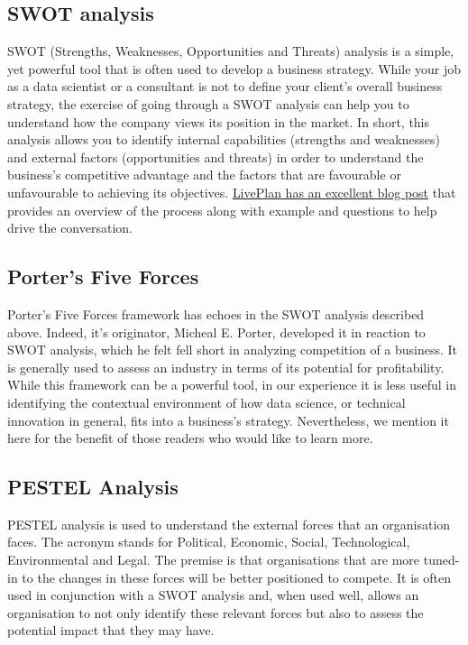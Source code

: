 \documentclass[
]{book}
\begin{document}
\hypertarget{swot-analysis}{%
\subsection{SWOT analysis}\label{swot-analysis}}

SWOT (Strengths, Weaknesses, Opportunities and Threats) analysis is a simple, yet powerful tool that is often used to develop a business strategy. While your job as a data scientist or a consultant is not to define your client's overall business strategy, the exercise of going through a SWOT analysis can help you to understand how the company views its position in the market. In short, this analysis allows you to identify internal capabilities (strengths and weaknesses) and external factors (opportunities and threats) in order to understand the business's competitive advantage and the factors that are favourable or unfavourable to achieving its objectives. \href{https://www.liveplan.com/blog/what-is-a-swot-analysis-and-how-to-do-it-right-with-examples/}{LivePlan has an excellent blog post} that provides an overview of the process along with example and questions to help drive the conversation.

\hypertarget{porters-five-forces}{%
\subsection{Porter's Five Forces}\label{porters-five-forces}}

Porter's Five Forces framework has echoes in the SWOT analysis described above. Indeed, it's originator, Micheal E. Porter, developed it in reaction to SWOT analysis, which he felt fell short in analyzing competition of a business. It is generally used to assess an industry in terms of its potential for profitability. While this framework can be a powerful tool, in our experience it is less useful in identifying the contextual environment of how data science, or technical innovation in general, fits into a business's strategy. Nevertheless, we mention it here for the benefit of those readers who would like to learn more.

\hypertarget{pestel-analysis}{%
\subsection{PESTEL Analysis}\label{pestel-analysis}}

PESTEL analysis is used to understand the external forces that an organisation faces. The acronym stands for Political, Economic, Social, Technological, Environmental and Legal. The premise is that organisations that are more tuned-in to the changes in these forces will be better positioned to compete. It is often used in conjunction with a SWOT analysis and, when used well, allows an organisation to not only identify these relevant forces but also to assess the potential impact that they may have.
\end{document}
